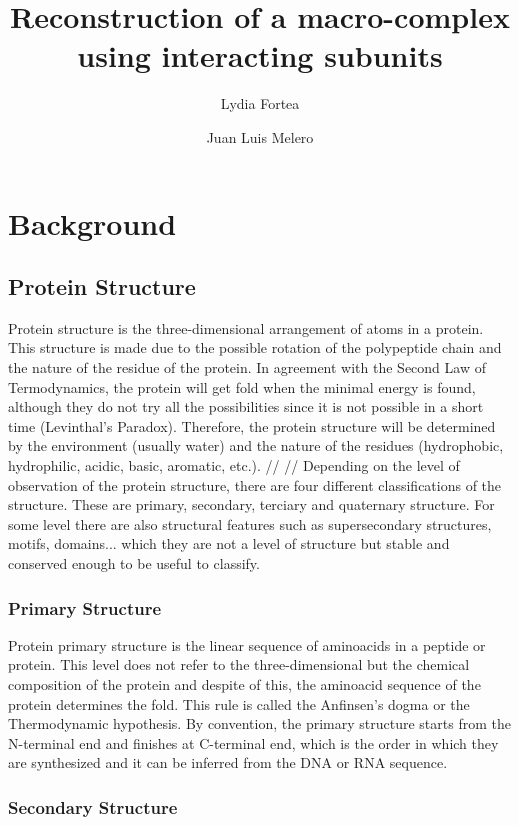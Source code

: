 \documentclass[a4paper,12pt]{report}
\title{Reconstruction of a macro-complex using interacting subunits}
\author{Lydia Fortea \and Juan Luis Melero}
\date{}
\begin{document}
\maketitle
\tableofcontents{}

\chapter{Background}


\section{Protein Structure}

Protein structure is the three-dimensional arrangement of atoms in a protein. 
This structure is made due to the possible rotation of the polypeptide chain and the nature of the residue of the protein.
In agreement with the Second Law of Termodynamics, the protein will get fold when the minimal energy is found, although they do not try all the possibilities since it is not possible in a short time (Levinthal's Paradox).
Therefore, the protein structure will be determined by the environment (usually water) and the nature of the residues (hydrophobic, hydrophilic, acidic, basic, aromatic, etc.).
//
//
Depending on the level of observation of the protein structure, there are four different classifications of the structure. These are primary, secondary, terciary and quaternary structure.
For some level there are also structural features such as supersecondary structures, motifs, domains... which they are not a level of structure but stable and conserved enough to be useful to classify.


\subsection{Primary Structure}

Protein primary structure is the linear sequence of aminoacids in a peptide or protein. This level does not refer to the three-dimensional but the chemical composition of the protein and despite of this,
the aminoacid sequence of the protein determines the fold. This rule is called the Anfinsen's dogma or the Thermodynamic hypothesis. By convention, the primary structure starts from the N-terminal end and finishes at C-terminal end, which is the order in which they are synthesized and it can be inferred from the DNA or RNA sequence.


\subsection{Secondary Structure}
\end{document}
